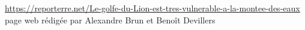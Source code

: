 \documentclass[a4paper,french,10pt]{article}
\begin{document}
\renewcommand\refname{}
\begin{thebibliography}{9}
	\url{https://reporterre.net/Le-golfe-du-Lion-est-tres-vulnerable-a-la-montee-des-eaux}
	page web rédigée par Alexandre Brun et Benoît Devillers
\end{thebibliography}



%


\end{document}
